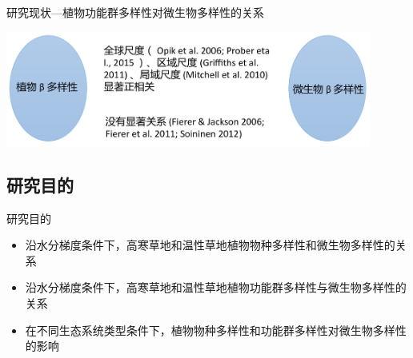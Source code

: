 \begin{frame}{\insertsection}{\insertsubsection}
	研究现状—植物功能群多样性对微生物多样性的关系
		\begin{center}
			\includegraphics[width = 0.9\textwidth]{./pic/研究现状2.png}
		\end{center}
\end{frame}


\subsection{研究目的}
\begin{frame}{\insertsection}{\insertsubsection}
	研究目的
	\begin{itemize}
		\item 沿水分梯度条件下，高寒草地和温性草地植物物种多样性和微生物多样性的关系
		\item 沿水分梯度条件下，高寒草地和温性草地植物功能群多样性与微生物多样性的关系
		\item 在不同生态系统类型条件下，植物物种多样性和功能群多样性对微生物多样性的影响
	\end{itemize}
\end{frame}